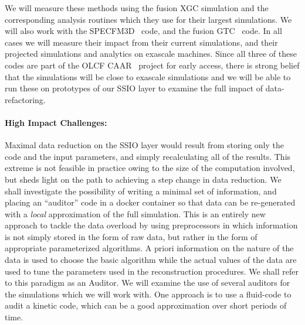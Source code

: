 We will measure these methods using the fusion XGC simulation and the
corresponding analysis routines which they use for their largest simulations.
We will also work with the SPECFM3D~\cite{SPECFEM3D} code, and the
fusion GTC~\cite{klasky2003grid} code.  In all cases we will measure their
impact from their current simulations, and their projected simulations and
analytics on exascale machines. Since all three of these codes are part of the
OLCF CAAR~\cite{CAAR} project for early access, there is strong belief that the
simulations will be close to exascale simulations and we will be able to run
these on prototypes of our SSIO layer to examine the full impact of
data-refactoring.

\paragraph{High Impact Challenges:} Maximal data reduction on the SSIO layer
would result from storing only the code and the input parameters, and simply
recalculating all of the results. This extreme is not feasible in practice
owing to the size of the computation involved, but sheds light on the path to
achieving a step change in data reduction. We shall investigate the possibility
of writing a minimal set of information, and placing an ``auditor'' code in a
docker container so that data can be re-generated with a {\em local}
approximation of the full simulation. This is an entirely new approach to
tackle the data overload by using preprocessors in which information is not
simply stored in the form of raw data, but rather in the form of appropriate
parameterized algorithms. A priori information on the nature of the data is
used to choose the basic algorithm while the actual values of the data are used
to tune the parameters used in the reconstruction procedures. We shall refer to
this paradigm as an Auditor.  We will examine the use of several auditors for
the simulations which we will work with. One approach is to use a fluid-code to
audit a kinetic code, which can be a good approximation over short periods of
time. 

